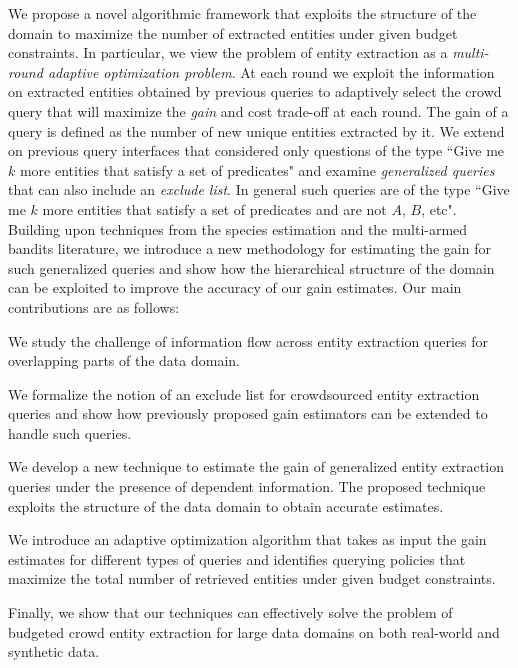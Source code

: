We propose a novel algorithmic framework that exploits the structure of the domain to maximize the number of extracted entities under given budget constraints. In particular, we view the problem of entity extraction as a {\em multi-round adaptive optimization problem}. At  each round we exploit the information on extracted entities obtained by previous queries to adaptively select the crowd query that will maximize the {\em gain} and cost trade-off at each round. The gain of a query is defined as the number of new unique entities extracted by it. We extend on previous query interfaces that considered only questions of the type ``Give me $k$ more entities that satisfy a set of predicates" and examine {\em generalized queries} that can also include an {\em exclude list}. In general such queries are of the type ``Give me $k$ more entities that satisfy a set of predicates and are not $A$, $B$, etc". Building upon techniques from the species estimation and the multi-armed bandits literature, we introduce a new methodology for estimating the gain for such generalized queries and show how the hierarchical structure of the domain can be exploited to improve the accuracy of our gain estimates. Our main contributions are as follows:

\squishlist
\item We study the challenge of information flow across entity extraction queries for overlapping parts of the data domain.
\item We formalize the notion of an exclude list for crowdsourced entity extraction queries and show how previously proposed gain estimators can be extended to handle such queries.
\item We develop a new technique to estimate the gain of generalized entity extraction queries under the presence of dependent information. The proposed technique exploits the structure of the data domain to obtain accurate estimates. 
\item We introduce an adaptive optimization algorithm that takes as input the gain estimates for different types of queries and identifies querying policies that maximize the total number of retrieved entities under given budget constraints. 
\item Finally, we show that our techniques can effectively solve the problem of budgeted crowd entity extraction for large data domains on both real-world and synthetic data.
\squishend


